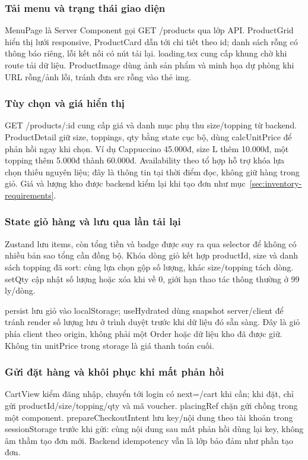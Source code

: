 \label{sec:catalog-cart}
\subsubsection{Tải menu và trạng thái giao diện}
MenuPage là Server Component gọi GET /products qua lớp API. ProductGrid hiển thị lưới responsive, ProductCard dẫn tới chi tiết theo id; danh sách rỗng có thông báo riêng, lỗi kết nối có nút tải lại. loading.tsx cung cấp khung chờ khi route tải dữ liệu. ProductImage dùng ảnh sản phẩm và minh họa dự phòng khi URL rỗng/ảnh lỗi, tránh đưa src rỗng vào thẻ img.

\subsubsection{Tùy chọn và giá hiển thị}
GET /products/:id cung cấp giá và danh mục phụ thu size/topping từ backend. ProductDetail giữ size, toppings, qty bằng state cục bộ, dùng calcUnitPrice để phản hồi ngay khi chọn. Ví dụ Cappuccino 45.000đ, size L thêm 10.000đ, một topping thêm 5.000đ thành 60.000đ. Availability theo tổ hợp hỗ trợ khóa lựa chọn thiếu nguyên liệu; đây là thông tin tại thời điểm đọc, không giữ hàng trong giỏ. Giá và lượng kho được backend kiểm lại khi tạo đơn như mục~\ref{sec:inventory-requirements}.

\subsubsection{State giỏ hàng và lưu qua lần tải lại}
Zustand lưu items, còn tổng tiền và badge được suy ra qua selector để không có nhiều bản sao tổng cần đồng bộ. Khóa dòng giỏ kết hợp productId, size và danh sách topping đã sort: cùng lựa chọn gộp số lượng, khác size/topping tách dòng. setQty cập nhật số lượng hoặc xóa khi về 0, giới hạn thao tác thông thường ở 99 ly/dòng.

persist lưu giỏ vào localStorage; useHydrated dùng snapshot server/client để tránh render số lượng lưu ở trình duyệt trước khi dữ liệu đó sẵn sàng. Đây là giỏ phía client theo origin, không phải một Order hoặc dữ liệu kho đã được giữ. Không tin unitPrice trong storage là giá thanh toán cuối.

\subsubsection{Gửi đặt hàng và khôi phục khi mất phản hồi}
CartView kiểm đăng nhập, chuyển tới login có next=/cart khi cần; khi đặt, chỉ gửi productId/size/topping/qty và mã voucher. placingRef chặn gửi chồng trong một component. prepareCheckoutIntent lưu key/nội dung theo tài khoản trong sessionStorage trước khi gửi: cùng nội dung sau mất phản hồi dùng lại key, không âm thầm tạo đơn mới. Backend idempotency vẫn là lớp bảo đảm như phần tạo đơn.


